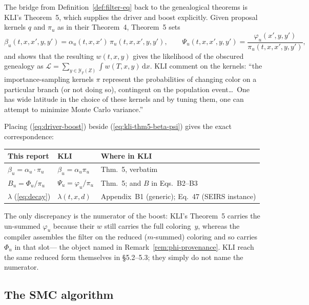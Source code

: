 \documentclass[11pt,leqno]{article}
\newcommand{\dd}[1]{\,\mathrm{d}{#1}}
\newcommand{\lik}{\mathcal{L}}      %
\theoremstyle{plain}
\theoremstyle{definition}
\begin{document}
The bridge from Definition~\ref{def:filter-eq} back to the
genealogical theorems is KLI's Theorem~5, which supplies the driver and
boost explicitly.  Given proposal kernels $q$ and $\pi_u$ as in their
Theorem~4, Theorem~5 sets
\begin{equation}\label{eq:kli-thm5-beta-psi}
  \beta_u(t,x,x',y,y') = \alpha_u(t,x,x')\,\pi_u(t,x,x',y,y'),
  \qquad
  \Psi_u(t,x,x',y,y')
    = \frac{\varphi_u(x', y, y')}{\pi_u(t,x,x',y,y')},
\end{equation}
and shows that the resulting $w(t,x,y)$ gives the likelihood of the
obscured genealogy as
$\lik = \sum_{y \in \mathcal{Y}_T(Z)} \int w(T,x,y)\dd{x}$.
KLI comment on the kernels: ``the importance-sampling kernels $\pi$
represent the probabilities of changing color on a particular branch
(or not doing so), contingent on the population event\ldots\ One has
wide latitude in the choice of these kernels and by tuning them, one
can attempt to minimize Monte Carlo variance.''

Placing (\ref{eq:driver-boost}) beside
(\ref{eq:kli-thm5-beta-psi}) gives the exact correspondence:
\begin{center}
\renewcommand{\arraystretch}{1.25}
\begin{tabular}{lll}
\toprule
\textbf{This report} & \textbf{KLI} & \textbf{Where in KLI} \\
\midrule
$\beta_u = \alpha_u \cdot \pi_u$
  & $\beta_u = \alpha_u \pi_u$
  & Thm.~5, verbatim \\
$B_u = \Phi_u / \pi_u$
  & $\Psi_u = \varphi_u / \pi_u$
  & Thm.~5; and $B$ in Eqs.~B2--B3 \\
$\lambda$ (\ref{eq:decay})
  & $\lambda(t,x,d)$
  & Appendix~B1 (generic); Eq.~47 (SEIRS instance) \\
\bottomrule
\end{tabular}
\end{center}
The only discrepancy is the numerator of the boost: KLI's Theorem~5
carries the un-summed $\varphi_u$ because their $w$ still carries the
full coloring~$y$, whereas the compiler assembles the filter on the
reduced ($m$-summed) coloring and so carries $\Phi_u$ in that slot---
the object named in Remark~\ref{rem:phi-provenance}.  KLI reach the
same reduced form themselves in \S5.2--5.3; they simply do not name
the numerator.

\subsection{The SMC algorithm}
\end{document}
